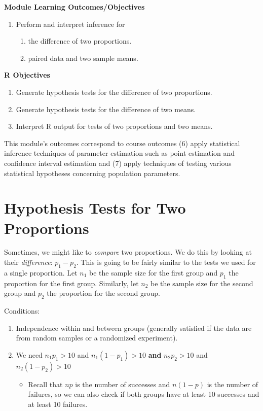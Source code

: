 \documentclass[
]{book}
\providecommand{\tightlist}{%
  \setlength{\itemsep}{0pt}\setlength{\parskip}{0pt}}
\begin{document}
\textbf{Module Learning Outcomes/Objectives}

\begin{enumerate}
\def\labelenumi{\arabic{enumi}.}
\tightlist
\item
  Perform and interpret inference for

  \begin{enumerate}
  \def\labelenumii{\alph{enumii}.}
  \tightlist
  \item
    the difference of two proportions.
  \item
    paired data and two sample means.
  \end{enumerate}
\end{enumerate}

\textbf{R Objectives}

\begin{enumerate}
\def\labelenumi{\arabic{enumi}.}
\tightlist
\item
  Generate hypothesis tests for the difference of two proportions.
\item
  Generate hypothesis tests for the difference of two means.
\item
  Interpret R output for tests of two proportions and two means.
\end{enumerate}

This module's outcomes correspond to course outcomes (6) apply statistical inference techniques of parameter estimation such as point estimation and confidence interval estimation and (7) apply techniques of testing various statistical hypotheses concerning population parameters.

\section{Hypothesis Tests for Two Proportions}\label{hypothesis-tests-for-two-proportions}

Sometimes, we might like to \emph{compare} two proportions. We do this by looking at their \emph{difference}: \(p_1 - p_2\). This is going to be fairly similar to the tests we used for a single proportion. Let \(n_1\) be the sample size for the first group and \(p_1\) the proportion for the first group. Similarly, let \(n_2\) be the sample size for the second group and \(p_2\) the proportion for the second group.

Conditions:

\begin{enumerate}
\def\labelenumi{\arabic{enumi}.}
\tightlist
\item
  Independence within and between groups (generally satisfied if the data are from random samples or a randomized experiment).
\item
  We need \(n_1p_1 > 10\) and \(n_1(1-p_1)>10\) \textbf{and} \(n_2p_2 > 10\) and \(n_2(1-p_2)>10\)

  \begin{itemize}
  \tightlist
  \item
    Recall that \(np\) is the number of successes and \(n(1-p)\) is the number of failures, so we can also check if both groups have at least 10 successes and at least 10 failures.
  \end{itemize}
\end{enumerate}
\end{document}
